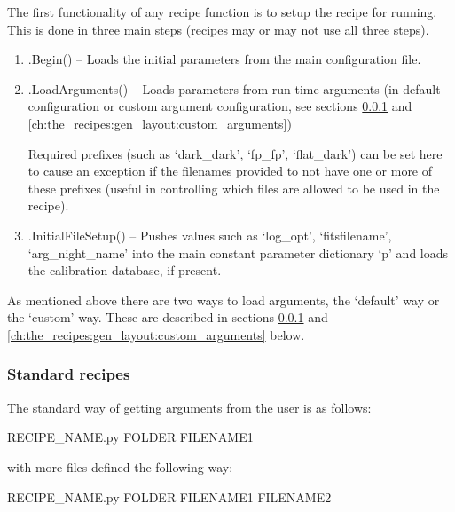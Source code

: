 The first functionality of any recipe \progMAIN function is to setup the recipe for running. This is done in three main steps (recipes may or may not use all three steps).

\begin{enumerate}
	\item \spirouStartup.Begin() -- Loads the initial parameters from the main configuration file.

	\item \spirouStartup.LoadArguments() -- Loads parameters from run time arguments (in default configuration or custom argument configuration, see sections \ref{ch:the_recipes:gen_layout:standard_recipes} and \ref{ch:the_recipes:gen_layout:custom_arguments})
	\begin{note}
	Required prefixes (such as `dark\_dark', `fp\_fp', `flat\_dark') can be set here to cause an exception if the filenames provided to not have one or more of these prefixes (useful in controlling which files are allowed to be used in the recipe).
	\end{note}

	\item \spirouStartup.InitialFileSetup() -- Pushes values such as `log\_opt', `fitsfilename', `arg\_night\_name' into the main constant parameter dictionary `p' and loads the calibration database, if present.
\end{enumerate}

As mentioned above there are two ways to load arguments, the `default' way or the `custom' way. These are described in sections \ref{ch:the_recipes:gen_layout:standard_recipes} and \ref{ch:the_recipes:gen_layout:custom_arguments} below.

\clearpage
\newpage
\subsubsection{Standard recipes}
\label{ch:the_recipes:gen_layout:standard_recipes}

The standard way of getting arguments from the user is as follows:

\begin{cmdbox}
RECIPE_NAME.py FOLDER FILENAME1
\end{cmdbox}

\noindent with more files defined the following way:

\begin{cmdbox}
RECIPE_NAME.py FOLDER FILENAME1 FILENAME2
\end{cmdbox}

